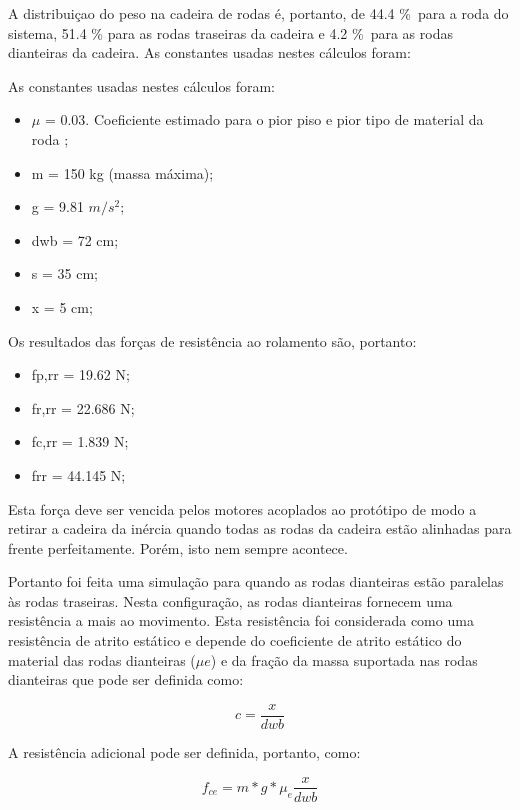 A distribuiçao do peso na cadeira de rodas é, portanto, de 44.4 \%\ para a roda do sistema, 51.4 \% para as rodas traseiras da cadeira e 4.2 \%\ para as rodas dianteiras da cadeira. As constantes usadas nestes cálculos foram:

As constantes usadas nestes cálculos foram:


\begin{itemize}
	\item $\mu$ = 0.03. Coeficiente estimado para o pior piso e pior tipo de material da roda \cite{rolling_resistance};
	\item m = 150 kg (massa máxima);
	\item g = 9.81 $m/s^2$;
	\item dwb = 72 cm;
	\item s = 35 cm;
	\item x = 5 cm;
\end{itemize}

Os resultados das forças de resistência ao rolamento são, portanto:

\begin{itemize}
	\item fp,rr = 19.62 N;
	\item fr,rr = 22.686 N;
	\item fc,rr = 1.839 N;
	\item frr = 44.145 N;
\end{itemize}

Esta força deve ser vencida pelos motores acoplados ao protótipo de modo a retirar a cadeira da inércia quando todas as rodas da cadeira estão alinhadas para frente perfeitamente. Porém, isto nem sempre acontece.

Portanto foi feita uma simulação para quando as rodas dianteiras estão paralelas às rodas traseiras. Nesta configuração, as rodas dianteiras fornecem uma resistência a mais ao movimento. Esta resistência foi considerada como uma resistência de atrito estático e depende do coeficiente de atrito estático do material das rodas dianteiras ($\mu e$) e da fração da massa suportada nas rodas dianteiras que pode ser definida como:

\begin{equation}
c = \frac{x}{dwb}
\end{equation}

A resistência adicional pode ser definida, portanto, como:

\begin{equation}
f_{ce}= m*g* \mu_e \frac{x}{dwb}
\end{equation}

